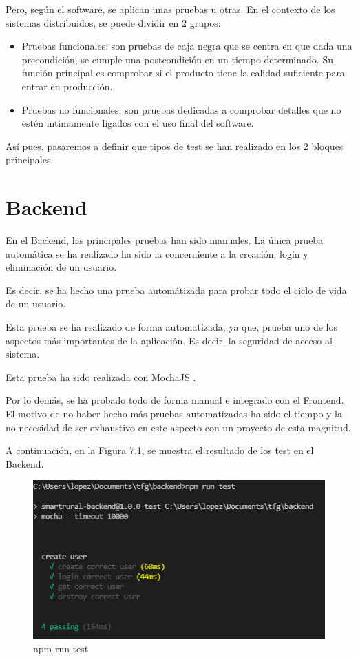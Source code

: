 Pero, según el software, se aplican unas pruebas u otras. En el contexto de los sistemas distribuidos, se puede dividir en 2 grupos:

\begin{itemize}
    \item Pruebas funcionales: son pruebas de caja negra que se centra en que dada una precondición, se cumple una postcondición en un tiempo determinado. Su función principal es comprobar si el producto tiene la calidad suficiente para entrar en producción.
    \item Pruebas no funcionales: son pruebas dedicadas a comprobar detalles que no estén intimamente ligados con el uso final del software.
\end{itemize}

Así pues, pasaremos a definir que tipos de test se han realizado en los 2 bloques principales.

\section{Backend}
En el Backend, las principales pruebas han sido manuales. La única prueba automática se ha realizado ha sido la concerniente a la creación, login y eliminación de un usuario.

Es decir, se ha hecho una prueba automátizada para probar todo el ciclo de vida de un usuario.

Esta prueba se ha realizado de forma automatizada, ya que, prueba uno de los aspectos más importantes de la aplicación. Es decir, la seguridad de acceso al sistema.

Esta prueba ha sido realizada con MochaJS \cite{mochajs}.

Por lo demás, se ha probado todo de forma manual e integrado con el Frontend. El motivo de no haber hecho más pruebas automatizadas ha sido el tiempo y la no necesidad de ser exhaustivo en este aspecto con un proyecto de esta magnitud.

A continuación, en la Figura 7.1, se muestra el resultado de los test en el Backend.

\begin{figure}[H]
    \centering
    \includegraphics[width=0.7\linewidth]{images/test/test user backend.png}
    \caption{npm run test}
\end{figure}

